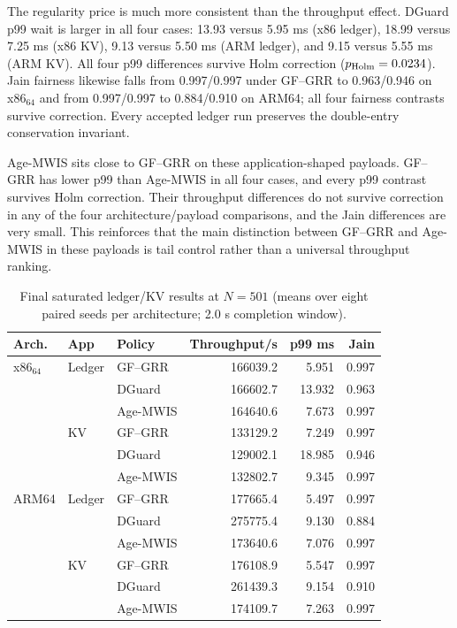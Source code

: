 \documentclass[10pt,journal]{IEEEtran}
\begin{document}
The regularity price is much more consistent than the throughput effect. DGuard p99 wait is larger in all four cases: 13.93 versus 5.95 ms (x86 ledger), 18.99 versus 7.25 ms (x86 KV), 9.13 versus 5.50 ms (ARM ledger), and 9.15 versus 5.55 ms (ARM KV). All four p99 differences survive Holm correction ($p_{\rm Holm}=0.0234$). Jain fairness likewise falls from 0.997/0.997 under GF--GRR to 0.963/0.946 on x86$_{64}$ and from 0.997/0.997 to 0.884/0.910 on ARM64; all four fairness contrasts survive correction. Every accepted ledger run preserves the double-entry conservation invariant.

Age-MWIS sits close to GF--GRR on these application-shaped payloads. GF--GRR has lower p99 than Age-MWIS in all four cases, and every p99 contrast survives Holm correction. Their throughput differences do not survive correction in any of the four architecture/payload comparisons, and the Jain differences are very small. This reinforces that the main distinction between GF--GRR and Age-MWIS in these payloads is tail control rather than a universal throughput ranking.

\begin{table}[t]
\centering
\caption{Final saturated ledger/KV results at $N=501$ (means over eight paired seeds per architecture; 2.0 s completion window).}
\label{tab:finalapps}
\footnotesize
\begin{tabular}{lllrrr}
\toprule
Arch. & App & Policy & Throughput/s & p99 ms & Jain\\
\midrule
x86$_{64}$ & Ledger & GF--GRR & 166039.2 & 5.951 & 0.997\\
 & & DGuard & 166602.7 & 13.932 & 0.963\\
 & & Age-MWIS & 164640.6 & 7.673 & 0.997\\
 & KV & GF--GRR & 133129.2 & 7.249 & 0.997\\
 & & DGuard & 129002.1 & 18.985 & 0.946\\
 & & Age-MWIS & 132802.7 & 9.345 & 0.997\\
\midrule
ARM64 & Ledger & GF--GRR & 177665.4 & 5.497 & 0.997\\
 & & DGuard & 275775.4 & 9.130 & 0.884\\
 & & Age-MWIS & 173640.6 & 7.076 & 0.997\\
 & KV & GF--GRR & 176108.9 & 5.547 & 0.997\\
 & & DGuard & 261439.3 & 9.154 & 0.910\\
 & & Age-MWIS & 174109.7 & 7.263 & 0.997\\
\bottomrule
\end{tabular}
\end{table}
\end{document}
